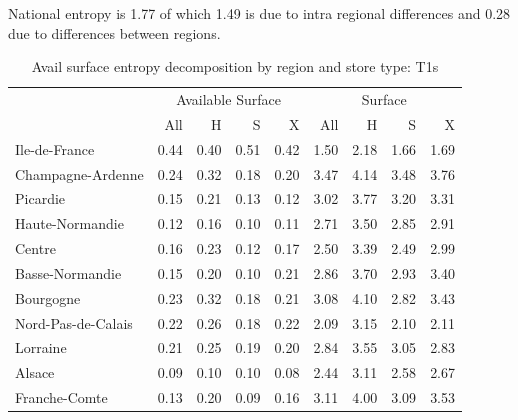 \documentclass[11pt]{article}
\begin{document}
National entropy is 1.77 of which 1.49 is due to intra regional differences and 0.28 due to differences between regions.

\begin{table}[H]
\caption{Avail surface entropy decomposition by region and store type: T1s}
\footnotesize

\begin{tabular}{l|rrrr|rrrr}
\toprule
\toprule
{} & \multicolumn{4}{c|}{Available Surface} & \multicolumn{4}{c}{Surface} \\
{} &  All &  H &  S &  X &     All &     H &     S &     X \\
\midrule
Ile-de-France              &        0.44 &          0.40 &          0.51 &          0.42 &       1.50 &       2.18 &       1.66 &       1.69 \\
Champagne-Ardenne          &        0.24 &          0.32 &          0.18 &          0.20 &       3.47 &       4.14 &       3.48 &       3.76 \\
Picardie                   &        0.15 &          0.21 &          0.13 &          0.12 &       3.02 &       3.77 &       3.20 &       3.31 \\
Haute-Normandie            &        0.12 &          0.16 &          0.10 &          0.11 &       2.71 &       3.50 &       2.85 &       2.91 \\
Centre                     &        0.16 &          0.23 &          0.12 &          0.17 &       2.50 &       3.39 &       2.49 &       2.99 \\
Basse-Normandie            &        0.15 &          0.20 &          0.10 &          0.21 &       2.86 &       3.70 &       2.93 &       3.40 \\
Bourgogne                  &        0.23 &          0.32 &          0.18 &          0.21 &       3.08 &       4.10 &       2.82 &       3.43 \\
Nord-Pas-de-Calais         &        0.22 &          0.26 &          0.18 &          0.22 &       2.09 &       3.15 &       2.10 &       2.11 \\
Lorraine                   &        0.21 &          0.25 &          0.19 &          0.20 &       2.84 &       3.55 &       3.05 &       2.83 \\
Alsace                     &        0.09 &          0.10 &          0.10 &          0.08 &       2.44 &       3.11 &       2.58 &       2.67 \\
Franche-Comte              &        0.13 &          0.20 &          0.09 &          0.16 &       3.11 &       4.00 &       3.09 &       3.53 \\

\end{tabular}
\end{table}
\end{document}
